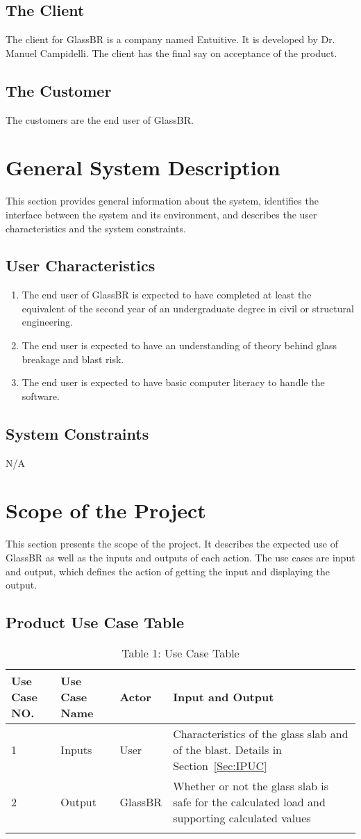 \documentclass[12pt]{article}
\begin{document}
\subsection{The Client}
\label{Sec:TC}
The client for GlassBR is a company named Entuitive. It is developed by Dr. Manuel Campidelli. The client has the final say on acceptance of the product.
\subsection{The Customer}
\label{Sec:TC}
The customers are the end user of GlassBR.
\section{General System Description}
\label{Sec:GSD}
This section provides general information about the system, identifies the interface between the system and its environment, and describes the user characteristics and the system constraints.
\subsection{User Characteristics}
\label{Sec:UC}
\begin{enumerate}
\item{The end user of GlassBR is expected to have completed at least the equivalent of the second year of an undergraduate degree in civil or structural engineering.}
\item{The end user is expected to have an understanding of theory behind glass breakage and blast risk.}
\item{The end user is expected to have basic computer literacy to handle the software.}
\end{enumerate}
\subsection{System Constraints}
\label{Sec:SC}
N/A
\section{Scope of the Project}
\label{Sec:SotP}
This section presents the scope of the project. It describes the expected use of GlassBR as well as the inputs and outputs of each action. The use cases are input and output, which defines the action of getting the input and displaying the output.
\subsection{Product Use Case Table}
\label{Sec:PUCT}
\begin{longtable}{l l l l}
\toprule
Use Case NO. & Use Case Name & Actor & Input and Output
\\
\midrule
1 & Inputs & User & Characteristics of the glass slab and of the blast. Details in Section~\ref{Sec:IPUC}
\\
2 & Output & GlassBR & Whether or not the glass slab is safe for the calculated load and supporting calculated values
\\
\bottomrule
\caption{Table 1: Use Case Table}
\label{Table:T1UCT}
\end{longtable}
\end{document}
